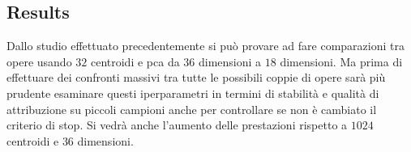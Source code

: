 \begin{toDo}
	\subsection{Results}
	Dallo studio effettuato precedentemente si può provare ad fare comparazioni tra opere usando $32$ centroidi e \gls{pca} da $36$ dimensioni a $18$ dimensioni. Ma prima di effettuare dei confronti massivi tra tutte le possibili coppie di opere sarà più prudente esaminare questi iperparametri in termini di stabilità e qualità di attribuzione su piccoli campioni anche per controllare se non è cambiato il criterio di stop.
	Si vedrà anche l'aumento delle prestazioni rispetto a $1024$ centroidi e $36$ dimensioni.
\end{toDo}
